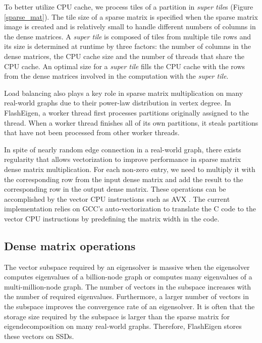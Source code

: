 To better utilize CPU cache, we process tiles of a partition in
\textit{super tile}s (Figure \ref{sparse_mat}). The tile size of a sparse
matrix is specified when the sparse matrix image is created and is relatively
small to handle different numbers of columns in the dense matrices.
A \textit{super tile} is composed of tiles from multiple tile rows and its
size is determined at runtime by three factors: the number of columns
in the dense matrices, the CPU cache size and the number of threads that
share the CPU cache. An optimal size for a \textit{super tile} fills
the CPU cache with the rows from the dense matrices involved in
the computation with the \textit{super tile}.

Load balancing also plays a key role in sparse matrix multiplication on
many real-world graphs due to their power-law distribution in vertex degree.
In FlashEigen, a worker thread first processes partitions originally assigned
to the thread. When a worker thread finishes
all of its own partitions, it steals partitions that have not been processed
from other worker threads.

In spite of nearly random edge connection in a real-world graph,
there exists regularity that allows vectorization to improve performance
in sparse matrix dense matrix multiplication. For each non-zero entry, we
need to multiply it with the corresponding row from the input dense matrix
and add the result to the corresponding row in the output dense matrix.
These operations can be accomplished by the vector CPU instructions such as
AVX \cite{avx}. The current implementation relies on GCC's auto-vectorization
to translate the C code to the vector CPU instructions by predefining the matrix
width in the code.

\subsection{Dense matrix operations}
The vector subspace required by an eigensolver is massive when the eigensolver
computes eigenvalues of a billion-node graph or computes many eigenvalues
of a multi-million-node graph. The number of vectors in the subspace
increases with the number of required eigenvalues. Furthermore, a larger
number of vectors in the subspace improves the convergence rate of an eigensolver. 
It is often that the storage size required by the subspace is larger than
the sparse matrix for eigendecomposition on many real-world graphs. Therefore,
FlashEigen stores these vectors on SSDs.

